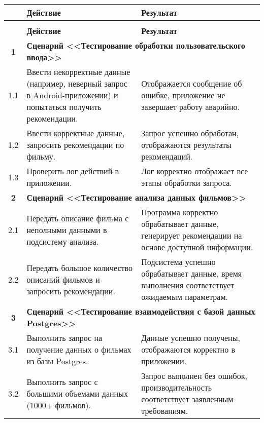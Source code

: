 \begin{longtable}{|c|p{7.5cm}|p{7.5cm}|}
	\caption{} \label{table:test} \\
	\hline
	\textbf{\No} & \textbf{Действие} & \textbf{Результат} \\
	\hline
	\endfirsthead
	\conttable{table:test} \\
	\hline
	\textbf{\No} & \textbf{Действие} & \textbf{Результат} \\
	\hline
	\endhead

	\textbf{1}
	& \multicolumn{2}{|l|}{\textbf{Сценарий <<Тестирование обработки пользовательского ввода>>}} \\ \hline
	1.1
	& Ввести некорректные данные (например, неверный запрос в Android-приложении) и попытаться получить рекомендации.
	& Отображается сообщение об ошибке, приложение не завершает работу аварийно. \\ \hline

	1.2
	& Ввести корректные данные, запросить рекомендации по фильму.
	& Запрос успешно обработан, отображаются результаты рекомендаций. \\ \hline

	1.3
	& Проверить лог действий в приложении.
	& Лог корректно отображает все этапы обработки запроса. \\ \hline

	\textbf{2}
	& \multicolumn{2}{|l|}{\textbf{Сценарий <<Тестирование анализа данных фильмов>>}} \\ \hline
	2.1
	& Передать описание фильма с неполными данными в подсистему анализа.
	& Программа корректно обрабатывает данные, генерирует рекомендации на основе доступной информации. \\ \hline

	2.2
	& Передать большое количество описаний фильмов и запросить рекомендации.
	& Подсистема успешно обрабатывает данные, время выполнения соответствует ожидаемым параметрам. \\ \hline

	\textbf{3}
	& \multicolumn{2}{|l|}{\textbf{Сценарий <<Тестирование взаимодействия с базой данных Postgres>>}} \\ \hline
	3.1
	& Выполнить запрос на получение данных о фильмах из базы Postgres.
	& Данные успешно получены, отображаются корректно в приложении. \\ \hline

	3.2
	& Выполнить запрос с большими объемами данных (1000+ фильмов).
	& Запрос выполнен без ошибок, производительность соответствует заявленным требованиям. \\ \hline


\end{longtable}
